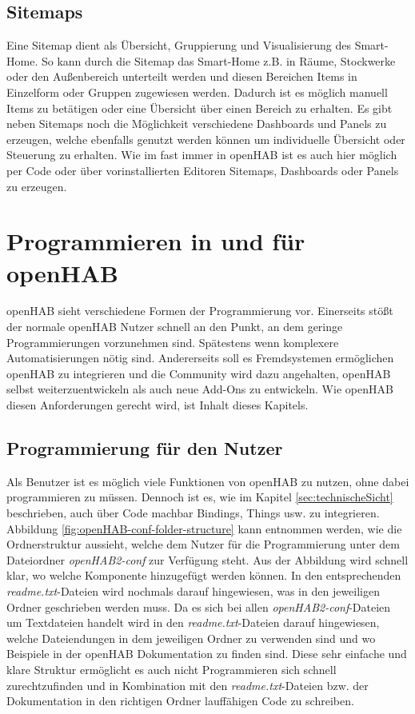 \subsection{Sitemaps}
Eine Sitemap dient als Übersicht, Gruppierung und Visualisierung des Smart-Home. So kann durch die Sitemap das Smart-Home z.B. in Räume, Stockwerke oder den Außenbereich unterteilt werden und diesen Bereichen Items in Einzelform oder Gruppen zugewiesen werden. Dadurch ist es möglich manuell Items zu betätigen oder eine Übersicht über einen Bereich zu erhalten. Es gibt neben Sitemaps noch die Möglichkeit verschiedene Dashboards und Panels zu erzeugen, welche ebenfalls genutzt werden können um individuelle Übersicht oder Steuerung zu erhalten.
Wie im fast immer in openHAB ist es auch hier möglich per Code oder über vorinstallierten Editoren Sitemaps, Dashboards oder Panels zu erzeugen.

\section{Programmieren in und für openHAB} \label{sec:custom-development}
openHAB sieht verschiedene Formen der Programmierung vor. Einerseits stößt der normale openHAB Nutzer schnell an den Punkt, an dem geringe Programmierungen vorzunehmen sind. Spätestens wenn komplexere Automatisierungen nötig sind. Andererseits soll es Fremdsystemen ermöglichen openHAB zu integrieren und die Community wird dazu angehalten, openHAB selbst weiterzuentwickeln als auch neue Add-Ons zu entwickeln. Wie openHAB diesen Anforderungen gerecht wird, ist Inhalt dieses Kapitels.

\subsection{Programmierung für den Nutzer}
Als Benutzer ist es möglich viele Funktionen von openHAB zu nutzen, ohne dabei programmieren zu müssen. Dennoch ist es, wie im Kapitel \ref{sec:technischeSicht} beschrieben, auch über Code machbar Bindings, Things usw. zu integrieren. Abbildung \ref{fig:openHAB-conf-folder-structure} kann entnommen werden, wie die Ordnerstruktur aussieht, welche dem Nutzer für die Programmierung unter dem Dateiordner \textit{openHAB2-conf} zur Verfügung steht. Aus der Abbildung wird schnell klar, wo welche Komponente hinzugefügt werden können. In den entsprechenden \textit{readme.txt}-Dateien wird nochmals darauf hingewiesen, was in den jeweiligen Ordner geschrieben werden muss. Da es sich bei allen \textit{openHAB2-conf}-Dateien um Textdateien handelt wird in den \textit{readme.txt}-Dateien darauf hingewiesen, welche Dateiendungen in dem jeweiligen Ordner zu verwenden sind und wo Beispiele in der openHAB Dokumentation zu finden sind. Diese sehr einfache und klare Struktur ermöglicht es auch nicht Programmieren sich schnell zurechtzufinden und in Kombination mit den \textit{readme.txt}-Dateien bzw. der Dokumentation in den richtigen Ordner lauffähigen Code zu schreiben.

